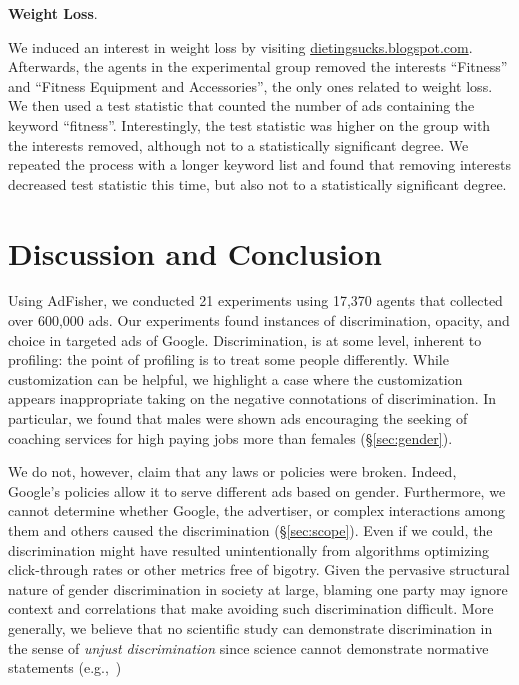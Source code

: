 \documentclass{article}
\makeatletter
\newcommand\gobblepars{\@ifnextchar\par {\expandafter\gobblepars\@gobble}{}}
\renewcommand{\paragraph}[1]{\smallskip\noindent\textbf{#1}.\ \ \gobblepars}
\makeatother
\begin{document}
\paragraph{Weight Loss}
We induced an interest in weight loss by visiting \url{dietingsucks.blogspot.com}.
Afterwards, the agents in the experimental group removed the interests ``Fitness'' and ``Fitness Equipment and Accessories'', the only ones related to weight loss.
We then used a test statistic that counted the number of ads containing the keyword ``fitness''.
Interestingly, the test statistic was higher on the group with the interests removed, although not to a statistically significant degree.
We repeated the process with a longer keyword list and found that removing interests decreased test statistic this time, but also not to a statistically significant degree.






\section{Discussion and Conclusion}
\label{sec:disc}

Using AdFisher, we conducted 21 experiments using 17,370 agents that collected over 600,000 ads. 
Our experiments found instances of discrimination, opacity, and choice in targeted ads of Google.
Discrimination, is at some level, inherent to profiling: the point of profiling is to treat some people differently.  While customization can be helpful, we highlight a case where the customization appears inappropriate taking on the negative connotations of discrimination.  In particular, we found that males were shown ads encouraging the seeking of coaching services for high paying jobs more than females (\S\ref{sec:gender}).  

We do not, however, claim that any laws or policies were broken.
Indeed, Google's policies allow it to serve different ads based on gender.
Furthermore, we cannot determine whether Google, the advertiser, or complex interactions among them and others caused the discrimination (\S\ref{sec:scope}).
Even if we could, the discrimination might have resulted unintentionally from algorithms optimizing click-through rates or other metrics free of bigotry.
Given the pervasive structural nature of gender discrimination in society at large, blaming one party may ignore context and correlations that make avoiding such discrimination difficult.
More generally, we believe that no scientific study can demonstrate discrimination in the sense of \emph{unjust discrimination} since science cannot demonstrate normative statements (e.g.,~\cite{hume1738treatise})
\end{document}
